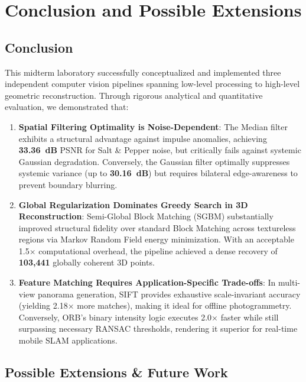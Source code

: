 \documentclass[a4paper,12pt]{article}
\begin{document}
\section{Conclusion and Possible Extensions}

\subsection{Conclusion}

This midterm laboratory successfully conceptualized and implemented three independent computer vision pipelines spanning low-level processing to high-level geometric reconstruction. Through rigorous analytical and quantitative evaluation, we demonstrated that:

\begin{enumerate}
    \item \textbf{Spatial Filtering Optimality is Noise-Dependent}: The Median filter exhibits a structural advantage against impulse anomalies, achieving \textbf{33.36~dB} PSNR for Salt \& Pepper noise, but critically fails against systemic Gaussian degradation. Conversely, the Gaussian filter optimally suppresses systemic variance (up to \textbf{30.16~dB}) but requires bilateral edge-awareness to prevent boundary blurring.
    \item \textbf{Global Regularization Dominates Greedy Search in 3D Reconstruction}: Semi-Global Block Matching (SGBM) substantially improved structural fidelity over standard Block Matching across textureless regions via Markov Random Field energy minimization. With an acceptable 1.5$\times$ computational overhead, the pipeline achieved a dense recovery of \textbf{103,441} globally coherent 3D points.
    \item \textbf{Feature Matching Requires Application-Specific Trade-offs}: In multi-view panorama generation, SIFT provides exhaustive scale-invariant accuracy (yielding 2.18$\times$ more matches), making it ideal for offline photogrammetry. Conversely, ORB's binary intensity logic executes 2.0$\times$ faster while still surpassing necessary RANSAC thresholds, rendering it superior for real-time mobile SLAM applications.
\end{enumerate}

\subsection{Possible Extensions \& Future Work}
\end{document}
